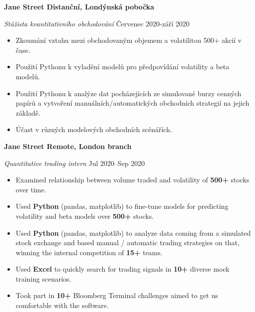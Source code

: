 \ifczech

\textbf{Jane Street \hfill Distanční, Londýnská pobočka} \par
\textit{Stážista kvantitativního obchodování} \hfill Červenec 2020-září 2020 \par
\begin{itemize}
	\item Zkoumání vztahu mezi obchodovaným objemem a volatilitou 500+ akcií v čase.
\item Použití Pythonu k vyladění modelů pro předpovídání volatility a beta modelů.
\item Použití Pythonu k analýze dat pocházejících ze simulované burzy cenných papírů a vytvoření manuálních/automatických obchodních strategií na jejich základě.
\item Účast v různých modelových obchodních scénářích.
\end{itemize} \par

\else

\textbf{Jane Street \hfill  Remote, London branch} \par
\textit{Quantitative trading intern} \hfill Jul 2020--Sep 2020 \par
\begin{itemize}
	\item Examined relationship between volume traded and volatility of \textbf{500+} stocks over time.
	\item Used \textbf{Python} (pandas, matplotlib) to fine-tune models for predicting volatility and beta models over \textbf{500+} stocks.
	\item Used \textbf{Python} (pandas, matplotlib) to analyze data coming from a simulated stock exchange and based manual / automatic trading strategies on that, winning the internal competition of \textbf{15+} teams.
	\item Used \textbf{Excel} to quickly search for trading signals in \textbf{10+} diverse mock training scenarios.
	\item Took part in \textbf{10+} Bloomberg Terminal challenges aimed to get us comfortable with the software.
\end{itemize} \par

\fi